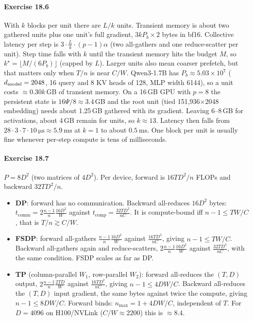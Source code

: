 \paragraph{Exercise 18.6}
With $k$ blocks per unit there are $L/k$ units. Transient memory is about two gathered units plus one
unit's full gradient, $3kP_b\times2$ bytes in bf16. Collective latency per step is
$3\cdot\frac{L}{k}\cdot(p-1)\alpha$ (two all-gathers and one reduce-scatter per unit). Step time
falls with $k$ until the transient memory hits the budget $M$, so $k^\star = \lfloor M/(6P_b)\rfloor$
(capped by $L$). Larger units also mean coarser prefetch, but that matters only when $T/n$ is
near $C/W$. Qwen3-1.7B has $P_b \approx 5.03\times10^7$ ($d_{\text{model}}=2048$, 16 query and 8 KV heads of
128, MLP width 6144), so a unit costs $\approx0.30k$\,GB of transient memory. On a 16\,GB GPU with $p=8$
the persistent state is $16\Psi/8\approx3.4$\,GB and the root unit (tied 151{,}936$\times$2048
embedding) needs about 1.25\,GB gathered with its gradient. Leaving 6--8\,GB for activations, about
4\,GB remain for units, so $k\approx13$. Latency then falls from $28\cdot3\cdot7\cdot\SI{10}{\micro\second}
\approx\SI{5.9}{\milli\second}$ at $k=1$ to about $\SI{0.5}{\milli\second}$. One block per unit
is usually fine whenever per-step compute is tens of milliseconds.

\paragraph{Exercise 18.7}
$P = 8D^2$ (two matrices of $4D^2$). Per device, forward is $16TD^2/n$ FLOPs and backward $32TD^2/n$.
\begin{itemize}
  \item \textbf{DP}: forward has no communication. Backward all-reduces $16D^2$ bytes:
    $t_\text{comm} = 2\frac{n-1}{n}\frac{16D^2}{W}$ against $t_\text{comp}=\frac{32TD^2}{nC}$.
    It is compute-bound iff $n-1 \le TW/C$, that is $T/n \gtrsim C/W$.
  \item \textbf{FSDP}: forward all-gathers $\frac{n-1}{n}\frac{16D^2}{W}$ against $\frac{16TD^2}{nC}$, giving
    $n-1\le TW/C$. Backward all-gathers again and reduce-scatters, $2\frac{n-1}{n}\frac{16D^2}{W}$ against
    $\frac{32TD^2}{nC}$, with the same condition. FSDP scales as far as DP.
  \item \textbf{TP} (column-parallel $W_1$, row-parallel $W_2$): forward all-reduces the $(T,D)$ output,
    $2\frac{n-1}{n}\frac{2TD}{W}$ against $\frac{16TD^2}{nC}$, giving $n-1 \le 4DW/C$. Backward
    all-reduces the $(T,D)$ input gradient, the same bytes against twice the compute, giving
    $n-1\le8DW/C$. Forward binds: $n_\text{max} = 1 + 4DW/C$, independent of $T$. For $D=4096$ on
    H100/NVLink ($C/W\approx2200$) this is $\approx8.4$.
\end{itemize}

